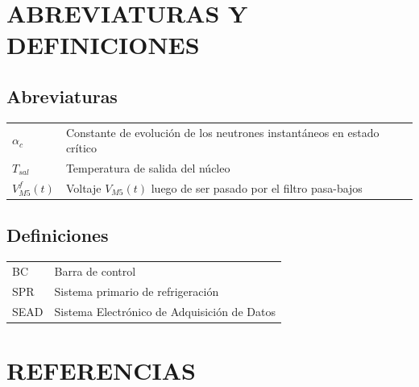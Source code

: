 \documentclass[a4paper,11pt]{article}
\begin{document}
\renewcommand\tablename{Tabla}  %

\maketitle

\pagestyle{fancy}           %

\renewcommand{\contentsname}{INDICE}
\tableofcontents

\newpage

\section{ABREVIATURAS Y DEFINICIONES} 

\subsection{Abreviaturas}\label{sec:abrev}

\renewcommand{\arraystretch}{1.2} %
\begin{tabular}{p{2.5cm} p{12.5cm}}

$\alpha_c$      & Constante de evolución de los neutrones instantáneos en estado crítico \\
$T_{sal}$       & Temperatura de salida del núcleo\\
$V^f_{M5}(t)$   & Voltaje $V_{M5}(t)$ luego de ser pasado por el filtro pasa-bajos  \\
\end{tabular}

\subsection{Definiciones}

\renewcommand{\arraystretch}{1}	%
\begin{tabular}{p{2.5cm} p{12.5cm}}

BC   	& Barra de control \\
SPR     & Sistema primario de refrigeración \\
SEAD    & Sistema Electrónico de Adquisición de Datos \\
\end{tabular}


\newpage

\section{REFERENCIAS}
\end{document}
